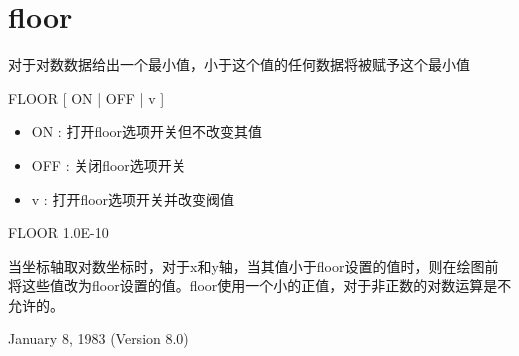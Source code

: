 \section{floor}
\label{cmd:floor}

对于对数数据给出一个最小值，小于这个值的任何数据将被赋予这个最小值

FLOOR   [ ON | OFF | v ]

\begin{itemize}
\item ON : 打开floor选项开关但不改变其值
\item OFF : 关闭floor选项开关
\item v : 打开floor选项开关并改变阀值
\end{itemize}

FLOOR 1.0E-10

当坐标轴取对数坐标时，对于x和y轴，当其值小于floor设置的值时，则在绘图前将这些值改为floor设置的值。floor使用一个小的正值，对于非正数的对数运算是不允许的。

January 8, 1983 (Version 8.0)
